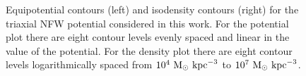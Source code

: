 \documentclass[letterpaper,12pt,preprint]{aastex}
\newcommand{\msun}{\ensuremath{\mathrm{M}_\odot}}
\newcommand{\chchchanges}[1]{{\color{red} {#1}}}
\begin{document}
\begin{figure}[p]
\centering
\caption{\chchchanges{Equipotential contours (left) and isodensity contours (right) for the triaxial NFW potential considered in this work. For the potential plot there are eight contour levels evenly spaced and linear in the value of the potential. For the density plot there are eight contour levels logarithmically spaced from $10^4~\msun~{\rm kpc}^{-3}$ to $10^7~\msun~{\rm kpc}^{-3}$.}}
\label{fig:potential}
\end{figure}
\end{document}
